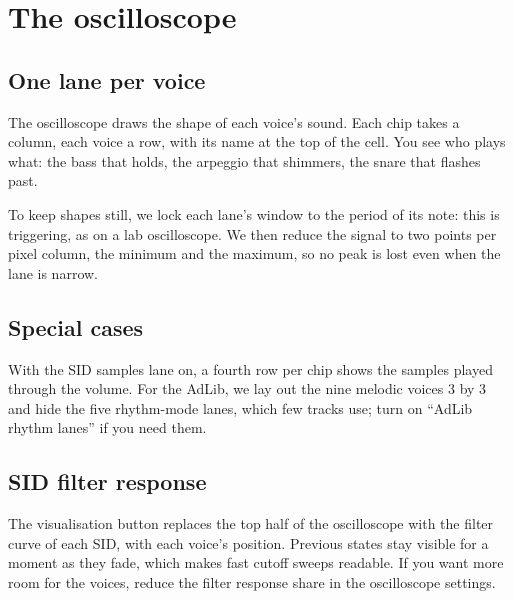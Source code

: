 \chapter{The oscilloscope}

\section{One lane per voice}
The oscilloscope draws the shape of each voice's sound. Each chip takes a column, each voice a row, with its name at
the top of the cell. You see who plays what: the bass that holds, the arpeggio that shimmers, the snare that flashes
past.

To keep shapes still, we lock each lane's window to the period of its note: this is triggering, as on a lab
oscilloscope. We then reduce the signal to two points per pixel column, the minimum and the maximum, so no peak is
lost even when the lane is narrow.

\section{Special cases}
With the SID samples lane on, a fourth row per chip shows the samples played through the volume. For the AdLib, we lay
out the nine melodic voices 3 by 3 and hide the five rhythm-mode lanes, which few tracks use; turn on ``AdLib rhythm
lanes'' if you need them.

\section{SID filter response}
The visualisation button replaces the top half of the oscilloscope with the filter curve of each SID, with each
voice's position. Previous states stay visible for a moment as they fade, which makes fast cutoff sweeps readable.
If you want more room for the voices, reduce the filter response share in the oscilloscope settings.

